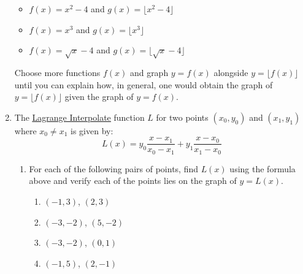 \begin{enumerate}
\begin{multicols}{2}
\begin{itemize}
\item  $f(x) = x^2-4$ and $g(x) = \lfloor x^2 -4\rfloor$

\end{itemize}

\end{multicols}


\begin{multicols}{2}

\begin{itemize}

\item  $f(x) = x^3$ and $g(x) = \lfloor x^3 \rfloor$

\item  $f(x) = \sqrt{x}-4$ and $g(x) = \lfloor \sqrt{x} -4  \rfloor$

\end{itemize}

\end{multicols}

Choose more functions $f(x)$ and graph $y = f(x)$ alongside $y = \lfloor f(x) \rfloor$ until you can explain how, in general, one would obtain the graph of $y = \lfloor f(x) \rfloor$ given the graph of $y = f(x)$.


\item \label{LagrangeLinearExercise} The \href{https://en.wikipedia.org/wiki/Lagrange_polynomial}{\underline{Lagrange Interpolate}} function $L$ for two points $(x_{0}, y_{0})$ and $(x_{1}, y_{1})$ where $x_{0} \neq x_{1}$  is given by: \[L(x) = y_{0}  \dfrac{x - x_{1}}{x_{0} - x_{1}}+ y_{1}\dfrac{x - x_{0}}{x_{1} - x_{0}}\]

\begin{enumerate}

\item For each of the following pairs of points,  find  $L(x)$ using the formula above and verify each of the points lies on the graph of $y = L(x)$.

\begin{multicols}{4}

\begin{enumerate}

\item  $(-1,3)$, $(2,3)$

\item  $(-3,-2)$,  $(5,-2)$

\item  $(-3,-2)$, $(0,1)$

\item  $(-1,5)$, $(2,-1)$


\end{enumerate}
\end{multicols}
\end{enumerate}
\end{enumerate}
